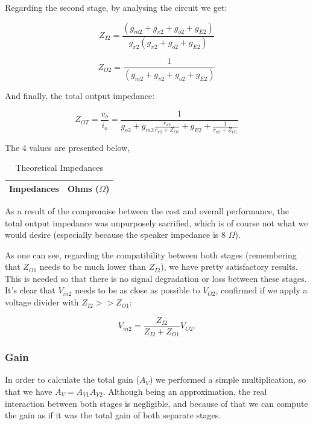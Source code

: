 Regarding the second stage, by analysing the circuit we get:

\begin{equation}
    Z_{I2}=\frac{(g_{m2}+g_{\pi2}+g_{o2}+g_{E2})}{g_{\pi2}(g_{\pi2}+g_{o2}+g_{E2})}
\end{equation}

\begin{equation}
    Z_{O2}=\frac{1}{(g_{m2}+g_{\pi2}+g_{o2}+g_{E2})}
\end{equation}

And finally, the total output impedance:

\begin{equation}
    Z_{OT}=\frac{v_o}{i_o}=\frac{1}{g_{o2}+g_{m2}\frac{r_{\pi2}}{r_{\pi2}+Z_{O1}}+g_{E2}+\frac{1}{r_{\pi2}+Z_{O1}}}
\end{equation}

The 4 values are presented below,

\begin{table}[h]
    \centering
    \begin{tabular}{|l|c|}
    \hline
    {\bf Impedances} & {\bf Ohms ($\Omega$)} \\ \hline
    
    \end{tabular}
    \caption{Theoretical Impedances}
    \label{tab:theo_imp}
\end{table}

As a result of the compromise between the cost and overall performance, the total output impedance was unpurposely sacrified, which is of course not what we would desire (especially because the speaker impedance is 8 $\Omega$). 

As one can see, regarding the compatibility between both stages (remembering that $Z_{O1}$ needs to be  much lower than $Z_{I2}$), we have pretty satisfactory results. This is needed so that there is no signal degradation or loss between these stages. It's clear that $V_{in2}$ needs to be as close as possible to $V_{O2}$, confirmed if we apply a voltage divider with $Z_{I2}>>Z_{O1}$:

\begin{equation}
    V_{in2} = \frac{Z_{I2}}{Z_{I2}+Z_{O1}} V_{O2}. 
\end{equation}

\subsubsection{Gain}

In order to calculate the total gain ($A_{V}$) we performed a simple multiplication, so that we have $A_V=A_{V1}A_{V2}$. Although being an approximation, the real interaction between both stages is negligible, and because of that we can compute the gain as if it was the total gain of both separate stages.

